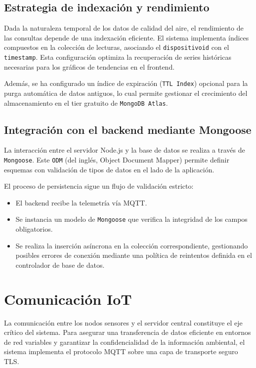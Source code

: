 \subsection{Estrategia de indexación y rendimiento}

Dada la naturaleza temporal de los datos de calidad del aire, el rendimiento de las consultas depende de una indexación eficiente. El sistema implementa índices compuestos en la colección de lecturas, asociando el \texttt{dispositivo\textunderscore id} con el \texttt{timestamp}. Esta configuración optimiza la recuperación de series históricas necesarias para los gráficos de tendencias en el frontend.

Además, se ha configurado un índice de expiración (\texttt{TTL Index}) opcional para la purga automática de datos antiguos, lo cual permite gestionar el crecimiento del almacenamiento en el tier gratuito de \texttt{MongoDB Atlas}.

\subsection{Integración con el backend mediante Mongoose}

La interacción entre el servidor Node.js y la base de datos se realiza a través de \texttt{Mongoose}. Este \texttt{ODM} (del inglés, Object Document Mapper) permite definir esquemas con validación de tipos de datos en el lado de la aplicación.

El proceso de persistencia sigue un flujo de validación estricto:

\begin{itemize}
    \item El backend recibe la telemetría vía MQTT.
    \item Se instancia un modelo de \texttt{Mongoose} que verifica la integridad de los campos obligatorios.
    \item Se realiza la inserción asíncrona en la colección correspondiente, gestionando posibles errores de conexión mediante una política de reintentos definida en el controlador de base de datos.
\end{itemize}

\section{Comunicación IoT}

La comunicación entre los nodos sensores y el servidor central constituye el eje crítico del sistema. Para asegurar una transferencia de datos eficiente en entornos de red variables y garantizar la confidencialidad de la información ambiental, el sistema implementa el protocolo MQTT sobre una capa de transporte seguro TLS.

